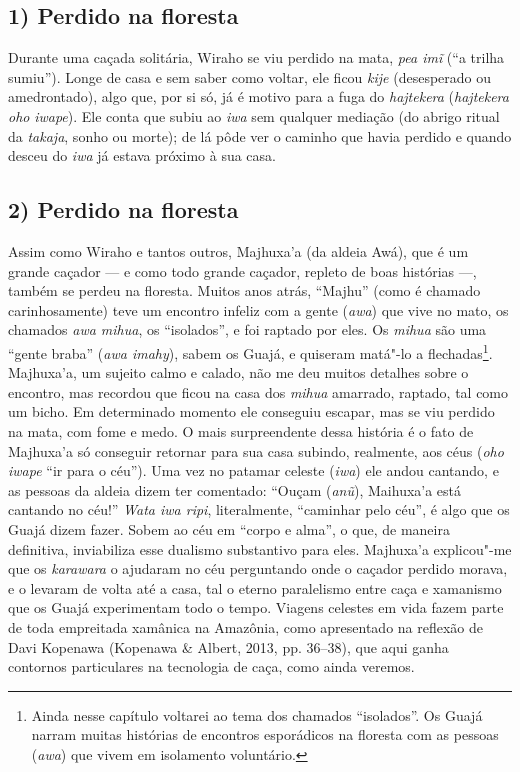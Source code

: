 \subsection{1) Perdido na floresta}

\forceindent Durante uma caçada solitária, Wiraho se viu perdido na mata, \emph{pea
imĩ} (``a trilha sumiu''). Longe de casa e sem saber como voltar, ele
ficou \emph{kije} (desesperado ou amedrontado), algo que, por si só, já
é motivo para a fuga do \emph{hajtekera} (\emph{hajtekera oho}
\emph{iwape}). Ele conta que subiu ao \emph{iwa} sem qualquer mediação
(do abrigo ritual da \emph{takaja}, sonho ou morte); de lá pôde ver o
caminho que havia perdido e quando desceu do \emph{iwa} já estava
próximo à sua casa.

\subsection{2) Perdido na floresta}

\forceindent Assim como Wiraho e tantos outros, Majhuxa'a (da aldeia Awá), que
é um grande caçador --- e como todo grande caçador, repleto de boas
histórias ---, também se perdeu na floresta. Muitos anos atrás, ``Majhu''
(como é chamado carinhosamente) teve um encontro infeliz com a gente
(\emph{awa}) que vive no mato, os chamados \emph{awa mihua}, os
``isolados'', e foi raptado por eles. Os \emph{mihua} são uma ``gente
braba'' (\emph{awa imahy}), sabem os Guajá, e quiseram matá"-lo a
flechadas\footnote{Ainda nesse capítulo voltarei ao tema dos chamados
  ``isolados''. Os Guajá narram muitas histórias de encontros esporádicos
  na floresta com as pessoas (\emph{awa}) que vivem em isolamento
  voluntário.}. Majhuxa'a, um sujeito calmo e calado, não me deu muitos
detalhes sobre o encontro, mas recordou que ficou na casa dos
\emph{mihua} amarrado, raptado, tal como um bicho. Em determinado
momento ele conseguiu escapar, mas se viu perdido na mata, com fome e
medo. O mais surpreendente dessa história é o fato de Majhuxa'a só
conseguir retornar para sua casa subindo, realmente, aos céus (\emph{oho
iwape} ``ir para o céu''). Uma vez no patamar celeste (\emph{iwa}) ele
andou cantando, e as pessoas da aldeia dizem ter comentado: ``Ouçam
(\emph{anũ}), Maihuxa'a está cantando no céu!'' \emph{Wata iwa ripi},
literalmente, ``caminhar pelo céu'', é algo que os Guajá dizem fazer.
Sobem ao céu em ``corpo e alma'', o que, de maneira definitiva,
inviabiliza esse dualismo substantivo para eles. Majhuxa'a explicou"-me
que os \emph{karawara} o ajudaram no céu perguntando onde o caçador
perdido morava, e o levaram de volta até a casa, tal o eterno
paralelismo entre caça e xamanismo que os Guajá experimentam todo o
tempo. Viagens celestes em vida fazem parte de toda empreitada xamânica
na Amazônia, como apresentado na reflexão de Davi Kopenawa (Kopenawa \&
Albert, 2013, pp. 36--38), que aqui ganha contornos particulares na
tecnologia de caça, como ainda veremos.

